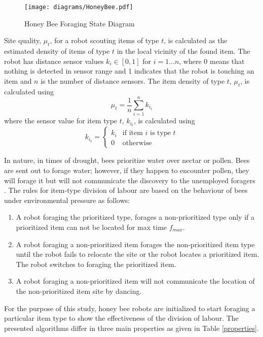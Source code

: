 \begin{figure}[h]
	\centering
	\texttt{[image: diagrams/HoneyBee.pdf]}
	\caption{Honey Bee Foraging State Diagram }
	\label{honeybeestate}
\end{figure}

Site quality, $\mu_t$, for a robot scouting items of type $t$, is calculated as the estimated density of items of type $t$ in the local vicinity of the found item. The robot has distance sensor values $k_i\in[0,1]$ for $ i = 1...n$, where 0 means that nothing is detected in sensor range and 1 indicates that the robot is touching an item and $n$ is the number of distance sensors. The item density of type $t$, $\mu_t$, is calculated using
\begin{equation}
\label{density}
\mu_t = \frac{1}{n}\sum\limits_{i=1}^n k_{i_t}
\end{equation}
where the sensor value for item type $t$, $k_{i_t}$, is calculated using 
\begin{equation}
\label{densitytype}
k_{i_t}=
    \begin{cases}
      k_i & \text{if item $i$ is type $t$} \\
      0 & \text{otherwise}
    \end{cases}
\end{equation}

In nature, in times of drought, bees prioritize water over nectar or pollen. Bees are sent out to forage water; however, if they happen to encounter pollen, they will forage it but will not communicate the discovery to the unemployed foragers  \cite{seeley2009wisdom}. The rules for item-type division of labour are based on the behaviour of bees under environmental pressure as follows:

\begin{enumerate}
\item A robot foraging the prioritized type, forages a non-prioritized type only if a prioritized item can not be located for max time $f_{max}$.
\item A robot foraging a non-prioritized item forages the non-prioritized item type until the robot fails to relocate the site or the robot locates a prioritized item. The robot switches to foraging the prioritized item.
\item A robot foraging a non-prioritized item will not communicate the location of the non-prioritized item site by dancing. 
\end{enumerate}

For the purpose of this study, honey bee robots are initialized to start foraging a particular item type to show the effectiveness of the division of labour. The presented algorithms differ in three main properties as given in Table \ref{properties}.

